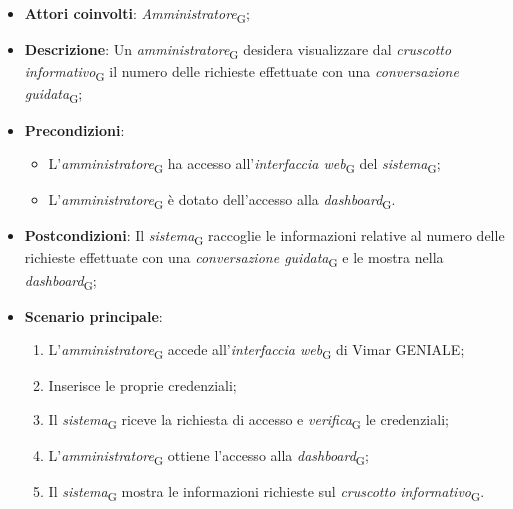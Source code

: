 \begin{itemize}
    \item \textbf{Attori coinvolti}: \textit{Amministratore}\textsubscript{G};
    \item \textbf{Descrizione}: Un \textit{amministratore}\textsubscript{G} desidera visualizzare dal \textit{cruscotto informativo}\textsubscript{G} il numero delle richieste effettuate con una \textit{conversazione guidata}\textsubscript{G};
    \item \textbf{Precondizioni}: 
    \begin{itemize}
        \item L’\textit{amministratore}\textsubscript{G} ha accesso all’\textit{interfaccia web}\textsubscript{G} del \textit{sistema}\textsubscript{G};
        \item L’\textit{amministratore}\textsubscript{G} è dotato dell’accesso alla \textit{dashboard}\textsubscript{G}.
    \end{itemize}
    \item \textbf{Postcondizioni}: Il \textit{sistema}\textsubscript{G} raccoglie le informazioni relative al numero delle richieste effettuate con una \textit{conversazione guidata}\textsubscript{G} e le mostra nella \textit{dashboard}\textsubscript{G};
    \item \textbf{Scenario principale}:
    \begin{enumerate}
        \item L’\textit{amministratore}\textsubscript{G} accede all’\textit{interfaccia web}\textsubscript{G} di Vimar GENIALE;
        \item Inserisce le proprie credenziali;
        \item Il \textit{sistema}\textsubscript{G} riceve la richiesta di accesso e \textit{verifica}\textsubscript{G} le credenziali;
        \item L’\textit{amministratore}\textsubscript{G} ottiene l’accesso alla \textit{dashboard}\textsubscript{G};
        \item Il \textit{sistema}\textsubscript{G} mostra le informazioni richieste sul \textit{cruscotto informativo}\textsubscript{G}.
    \end{enumerate}
\end{itemize}

